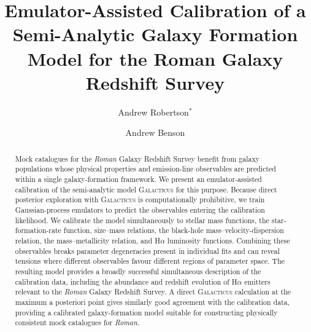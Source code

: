 \documentclass[twocolumn, apj, numberedappendix, iop]{openjournal}
\newcommand{\galacticus}{\textsc{Galacticus}\xspace}
\newcommand{\romanspace}{\textit{Roman}\xspace}
\newcommand{\ha}{H$\alpha$}
\begin{document}
\title{Emulator-Assisted Calibration of a Semi-Analytic Galaxy Formation Model for the Roman Galaxy Redshift Survey\vspace{-4ex}}

\author{Andrew Robertson$^{*}$}
\author{Andrew Benson}

\begin{abstract}
Mock catalogues for the \romanspace{} Galaxy Redshift Survey benefit from galaxy
populations whose physical properties and emission-line observables are predicted
within a single galaxy-formation framework. We present an emulator-assisted
calibration of the semi-analytic model \galacticus{} for this purpose. Because
direct posterior exploration with \galacticus{} is computationally prohibitive,
we train Gaussian-process emulators to predict the observables entering the
calibration likelihood. We calibrate the model simultaneously to stellar mass
functions, the star-formation-rate function, size--mass relations, the
black-hole mass--velocity-dispersion relation, the mass--metallicity relation,
and \ha{} luminosity functions. Combining these observables breaks parameter
degeneracies present in individual fits and can reveal tensions where different
observables favour different regions of parameter space. The resulting model
provides a broadly successful simultaneous description of the calibration data,
including the abundance and redshift evolution of \ha{} emitters relevant to the
\romanspace{} Galaxy Redshift Survey. A direct \galacticus{} calculation at the
maximum a posteriori point gives similarly good agreement with the calibration
data, providing a calibrated galaxy-formation model suitable for constructing
physically consistent mock catalogues for  \romanspace{}.
\end{abstract}

\end{document}

